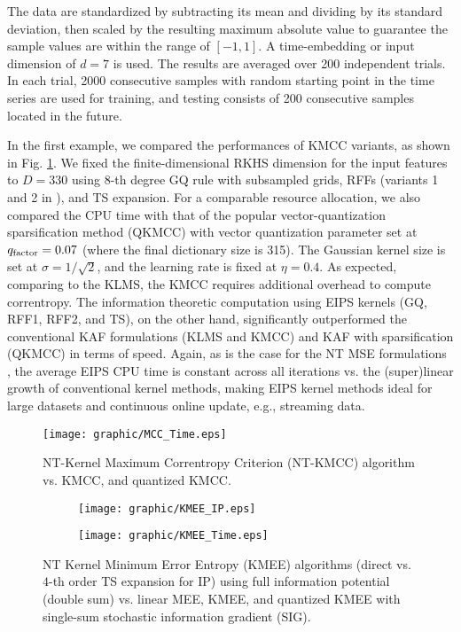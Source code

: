\documentclass[8pt,twocolumn]{IEEEtran}
\begin{document}
The data are standardized by subtracting its mean and dividing by its standard deviation, then scaled by the resulting maximum absolute value to guarantee the sample values are within the range of $[-1,1]$.  A time-embedding or input dimension of $d=7$ is used. The results are averaged over 200 independent trials. In each trial, 2000 consecutive samples with random starting point in the time series are used for training, and testing consists of 200 consecutive samples located in the future. 

In the first example, we compared the performances of KMCC variants, as shown in Fig. \ref{fig:KMCC}. We fixed the finite-dimensional RKHS dimension for the input features to $D =330$ using $8$-th degree GQ rule with subsampled grids, RFFs (variants 1 and 2 in \cite{Li2019notrick}), and TS expansion. For a comparable resource allocation, we also compared the CPU time with that of the popular vector-quantization sparsification method (QKMCC) with vector quantization parameter set at $q_{\rm factor} = 0.07$ (where the final dictionary size is 315). The Gaussian kernel size is set at $\sigma = 1/\sqrt{2}$, and the learning rate is fixed at $\eta = 0.4$. As expected, comparing to the KLMS, the KMCC requires additional overhead to compute correntropy. The information theoretic computation using EIPS kernels (GQ, RFF1, RFF2, and TS), on the other hand, significantly outperformed the conventional KAF formulations (KLMS and KMCC) and KAF with sparsification (QKMCC) in terms of speed. Again, as is the case for the NT MSE formulations \cite{Li2019notrick}, the average EIPS CPU time is constant across all iterations vs. the (super)linear growth of conventional kernel methods, making EIPS kernel methods ideal for large datasets and continuous online update, e.g., streaming data.

\begin{figure}[t!]
	\centering
	\texttt{[image: graphic/MCC\_Time.eps]}
	\caption{NT-Kernel Maximum Correntropy Criterion (NT-KMCC) algorithm vs. KMCC, and quantized KMCC.}
	\label{fig:KMCC}
\end{figure}

\begin{figure}[t!]
	\centering
	\begin{subfigure}
		\centering
		\texttt{[image: graphic/KMEE\_IP.eps]}
	\end{subfigure}\begin{subfigure}
		\centering
		\texttt{[image: graphic/KMEE\_Time.eps]}
	\end{subfigure}
	\caption{NT Kernel Minimum Error Entropy (KMEE) algorithms (direct vs. $4$-th order TS expansion for IP) using full information potential (double sum) vs. linear MEE, KMEE, and quantized KMEE with single-sum stochastic information gradient (SIG).}
	\label{fig:KMEE}
\end{figure}
\end{document}
